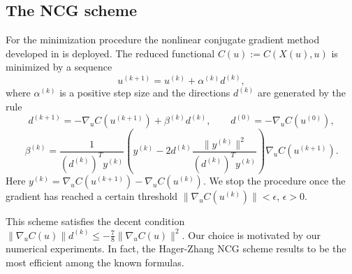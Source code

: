 \documentclass[a4paper,10pt, english]{article}
\begin{document}
 \subsection{The NCG scheme}
  For the minimization procedure the nonlinear conjugate gradient  method developed in \cite{hagerzhang} is deployed.
  The reduced functional $C(u):=C(X(u), u)$ is minimized by a sequence
  \begin{equation}
  u^{(k+1)} =   u^{(k)} + \alpha^{(k)} d^{(k)},
  \label{ncgscheme}
   \end{equation}  
  where $\alpha^{(k)}$ is a positive step size and the directions $d^{(k)}$ are generated by the rule
  \begin{equation}
  d^{(k+1)} = - \nabla_u C(u^{(k+1)}) + \beta^{(k)} d^{(k)}, \qquad d^{(0)} = -\nabla_u C(u^{(0)}),
  \label{drct}
  \end{equation}
  \begin{equation}
  \beta^{(k)} = \frac{1}{(d^{(k)})^T y^{(k)}} \left( y^{(k)} - 2d^{(k)}\frac{\|y^{(k)}\|^2}{(d^{(k)})^T y^{(k)}}\right)\nabla_u C(u^{(k+1)}).
  \label{drct}
  \end{equation}  
  Here $y^{(k)} = \nabla_u C(u^{(k+1)}) - \nabla_u C(u^{(k)})$. 
  We stop the procedure once the gradient has reached a certain threshold $\|\nabla_u C(u^{(k)})\| < \epsilon$, $\epsilon > 0$.
   
  This scheme satisfies the decent condition $\|\nabla_u C(u)\|d^{(k)} \leq -\frac{7}{8}\|\nabla_u C(u)\|^2$. Our choice is motivated by our numerical experiments. In fact, the Hager-Zhang NCG scheme results to be the most efficient among the known formulas. 
  
  
 
 
 
 
 
 
 
 
 
 
 
 
 
 
 
 
 
 
 
 
 
 
 
 
 
 \newpage
\end{document}
